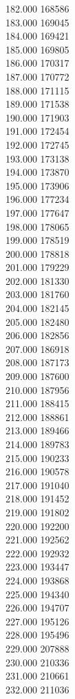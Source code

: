 { 182.000	168586 \\
 183.000	169045 \\
 184.000	169421 \\
 185.000	169805 \\
 186.000	170317 \\
 187.000	170772 \\
 188.000	171115 \\
 189.000	171538 \\
 190.000	171903 \\
 191.000	172454 \\
 192.000	172745 \\
 193.000	173138 \\
 194.000	173870 \\
 195.000	173906 \\
 196.000	177234 \\
 197.000	177647 \\
 198.000	178065 \\
 199.000	178519 \\
 200.000	178818 \\
 201.000	179229 \\
 202.000	181330 \\
 203.000	181760 \\
 204.000	182145 \\
 205.000	182480 \\
 206.000	182856 \\
 207.000	186918 \\
 208.000	187173 \\
 209.000	187600 \\
 210.000	187956 \\
 211.000	188415 \\
 212.000	188861 \\
 213.000	189466 \\
 214.000	189783 \\
 215.000	190233 \\
 216.000	190578 \\
 217.000	191040 \\
 218.000	191452 \\
 219.000	191802 \\
 220.000	192200 \\
 221.000	192562 \\
 222.000	192932 \\
 223.000	193447 \\
 224.000	193868 \\
 225.000	194340 \\
 226.000	194707 \\
 227.000	195126 \\
 228.000	195496 \\
 229.000	207888 \\
 230.000	210336 \\
 231.000	210661 \\
 232.000	211036 \\
}
